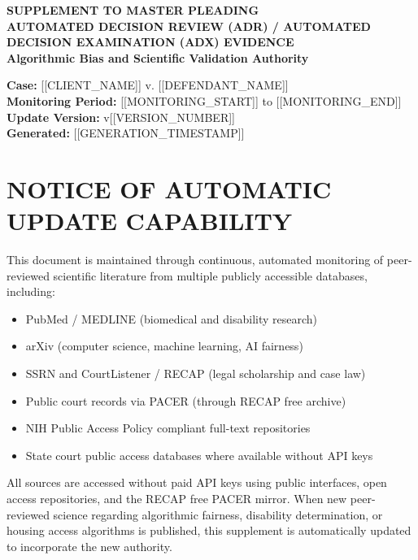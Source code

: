 \documentclass[12pt,letterpaper]{article}
\begin{document}
\begin{singlespacing}

\begin{center}
\textbf{\Large SUPPLEMENT TO MASTER PLEADING}\\
\vspace{6pt}
\textbf{\large AUTOMATED DECISION REVIEW (ADR) / AUTOMATED DECISION EXAMINATION (ADX) EVIDENCE}\\
\vspace{6pt}
\textbf{\large Algorithmic Bias and Scientific Validation Authority}
\end{center}

\vspace{12pt}

\noindent\textbf{Case:} [[CLIENT_NAME]] v. [[DEFENDANT_NAME]]\\
\textbf{Monitoring Period:} [[MONITORING_START]] to [[MONITORING_END]]\\
\textbf{Update Version:} v[[VERSION_NUMBER]]\\
\textbf{Generated:} [[GENERATION_TIMESTAMP]]

\vspace{18pt}

\section*{NOTICE OF AUTOMATIC UPDATE CAPABILITY}

This document is maintained through continuous, automated monitoring of peer-reviewed scientific literature from multiple publicly accessible databases, including:
\begin{itemize}[leftmargin=*]
    \item PubMed / MEDLINE (biomedical and disability research)
    \item arXiv (computer science, machine learning, AI fairness)
    \item SSRN and CourtListener / RECAP (legal scholarship and case law)
    \item Public court records via PACER (through RECAP free archive)
    \item NIH Public Access Policy compliant full-text repositories
    \item State court public access databases where available without API keys
\end{itemize}

\vspace{6pt}
\noindent All sources are accessed without paid API keys using public interfaces, open access repositories, and the RECAP free PACER mirror. When new peer-reviewed science regarding algorithmic fairness, disability determination, or housing access algorithms is published, this supplement is automatically updated to incorporate the new authority.


\end{singlespacing}
\end{document}
